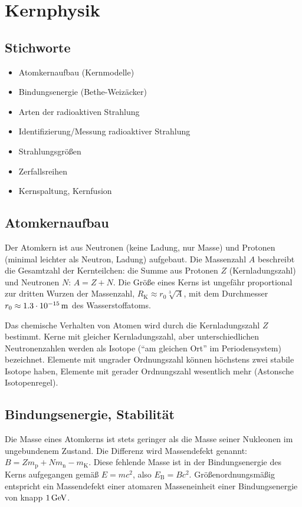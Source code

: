 \documentclass[a4paper]{scrartcl}
\begin{document}
\section{Kernphysik}

\subsection{Stichworte}
\begin{itemize}[noitemsep]
  \item Atomkernaufbau (Kernmodelle)
  \item Bindungsenergie (Bethe-Weizäcker)
  \item Arten der radioaktiven Strahlung
  \item Identifizierung/Messung radioaktiver Strahlung
  \item Strahlungsgrößen
  \item Zerfallsreihen
  \item Kernspaltung, Kernfusion
\end{itemize}

\subsection{Atomkernaufbau}
Der Atomkern ist aus Neutronen (keine Ladung, nur Masse) und Protonen (minimal leichter als Neutron, Ladung) aufgebaut. Die Massenzahl $A$ beschreibt die Gesamtzahl der Kernteilchen: die Summe aus Protonen $Z$ (Kernladungszahl) und Neutronen $N$: $A = Z+N$. Die Größe eines Kerns ist ungefähr proportional zur dritten Wurzen der Massenzahl, $R_\text{K} \approx r_0 \sqrt[3]{A}$, mit dem Durchmesser $r_0 \approx \unit[1.3 \cdot 10^{-15}]{m}$ des Wasserstoffatoms.

Das chemische Verhalten von Atomen wird durch die Kernladungszahl $Z$ bestimmt. Kerne mit gleicher Kernladungszahl, aber unterschiedlichen Neutronenzahlen werden als Isotope ("`am gleichen Ort"' im Periodensystem) bezeichnet. Elemente mit ungrader Ordnungszahl können höchstens zwei stabile Isotope haben, Elemente mit gerader Ordnungszahl wesentlich mehr (Astonsche Isotopenregel).

\subsection{Bindungsenergie, Stabilität}
Die Masse eines Atomkerns ist stets geringer als die Masse seiner Nukleonen im ungebundenem Zustand. Die Differenz wird Massendefekt genannt: $B = Zm_\text{p} + Nm_\text{n} - m_\text{K}$. Diese fehlende Masse ist in der Bindungsenergie des Kerns aufgegangen gemäß $E = mc^2$, also $E_\text{B} = Bc^2$. Größenordnungsmäßig entspricht ein Massendefekt einer atomaren Masseneinheit einer Bindungsenergie von knapp $\unit[1]{GeV}$.
\end{document}
